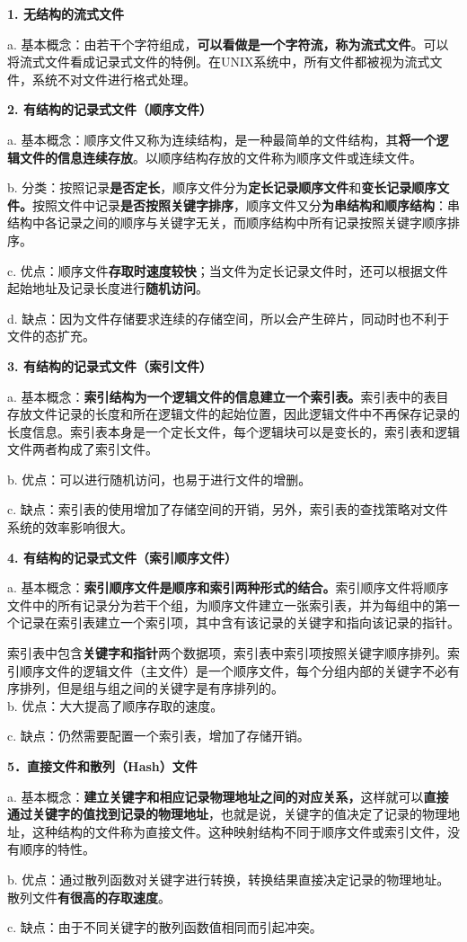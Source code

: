 \textbf{{1. 无结构的流式文件}}

a.
基本概念：由若干个字符组成，\textbf{可以看做是一个字符流，称为流式文件}。可以将流式文件看成记录式文件的特例。在UNIX系统中，所有文件都被视为流式文件，系统不对文件进行格式处理。

{\textbf{\textbf{{2. 有结构的记录式文件（顺序文件）}}}}

{a.
基本概念：顺序文件}{又称为连续结构，是一种最简单的文件结构，其}\textbf{将一个逻辑文件的信息连续存放}{。以顺序结构存放的文件称为顺序文件或连续文件。}

{b.
分类：}{按照记录}\textbf{是否定长}{，顺序文件分为}\textbf{定长记录顺序文件}{和}\textbf{变长记录顺序文件。}{按照文件中记录}\textbf{是否按照关键字排序}{，顺序文件又分}\textbf{为串结构和顺序结构}{：串结构中各记录之间的顺序与关键字无关，而顺序结构中所有记录按照关键字顺序排序。}

c.
优点：顺序文件\textbf{存取时速度较快}；当文件为定长记录文件时，还可以根据文件起始地址及记录长度进行\textbf{随机访问}。

d.
缺点：因为文件存储要求连续的存储空间，所以会产生碎片，同动{时也不利于文件的}{态扩充。}

\textbf{\textbf{{3. 有结构的记录式文件（索引文件）}}}

{a.
基本概念：}\textbf{索引结构为一个逻辑文件的信息建立一个索引表。}{索引表中的表目存放文件记录的长度和所在逻辑文件的起始位置，因此逻辑文件中不再保存记录的长度信息。索引表本身是一个定长文件，每个逻辑块可以是变长的，索引表和逻辑文件两者构成了索引文件。}

b. 优点：可以进行随机访问，也易于进行文件的增删。

c.
缺点：索引表的使用增加了存储空间的开销，另外，索引表的查找策略对文件系统的效率影响很大。

\textbf{{\textbf{\textbf{{4. 有结构的记录式文件（索引顺序文件）}}}}}

{a.
基本概念：}\textbf{索引顺序文件是顺序和索引两种形式的结合。}{索引顺序文件将顺序文件中的所有记录分为若干个组，为顺序文件建立一张索引表，并为每组中的第一个记录在索引表建立一个索引项，其中含有该记录的关键字和指向该记录的指针。}

索引表中包含\textbf{关键字和指针}两个数据项，索引表中索引项按照关键字顺序排列。索引顺序文件的逻辑文件（主文件）是一个顺序文件，每个分组内部的关键字不必有序排列，但是组与组之间的关键字是有序排列的。\\

b. 优点：{大大提高了顺序存取的速度。}

c. 缺点：仍然需要配置一个索引表，增加了存储开销。

\textbf{{5．直接文件和散列（Hash）文件}}

{a.
基本概念：}\textbf{建立关键字和相应记录物理地址之间的对应关系，}{这样就可以}\textbf{直接通过关键字的值找到记录的物理地址}{，也就是说，关键字的值决定了记录的物理地址，这种结构的文件称为直接文件。这种映射结构不同于顺序文件或索引文件，没有顺序的特性。}

b.
优点：通过散列函数对关键字进行转换，转换结果直接决定记录的物理地址。{散列文件\textbf{有很高的存取速度}。}

c. 缺点：由于不同关键字的散列函数值相同而引起冲突。
